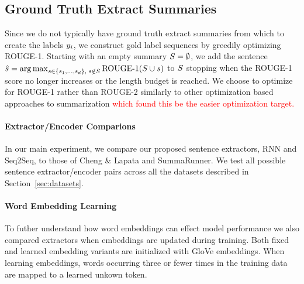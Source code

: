 \subsection{Ground Truth Extract Summaries}
Since we do not typically have ground truth extract summaries from which to
create the labels $\slabel_i$, we construct gold label sequences 
by greedily optimizing ROUGE-1. Starting with an empty summary $\summary = 
\null \emptyset$, we add the sentence $\hat{\sent} = 
{\argmax}_{ \sent \in \{\sent_1, \ldots, \sent_{\docsize}\},
\; \sent \notin \summary} \operatorname{ROUGE-1}(\summary \cup \sent)$
to $S$ stopping when the ROUGE-1 score no longer increases or the 
length budget is reached. We choose to optimize for ROUGE-1 rather than 
ROUGE-2 similarly to other optimization based approaches to summarization 
\textcolor{red}{
\cite{durrett2016learning,sipos2012large,nallapati2017summarunner} which found this
be the easier optimization target.}






\paragraph{Extractor/Encoder Comparions}{
In our main experiment, we compare our proposed 
sentence extractors, RNN and Seq2Seq,
to those of Cheng \& Lapata and SummaRunner.
We test all possible sentence extractor/encoder pairs across all the datasets
described in Section~\ref{sec:datasets}.} 


\paragraph{Word Embedding Learning}{To futher understand how word 
embeddings 
can
effect model performance we also compared extractors when embeddings 
are updated during training. Both fixed and learned embedding variants are 
initialized with GloVe embeddings. When learning embeddings, words occurring 
three or fewer times in the training data are mapped to a learned unkown
token.}

